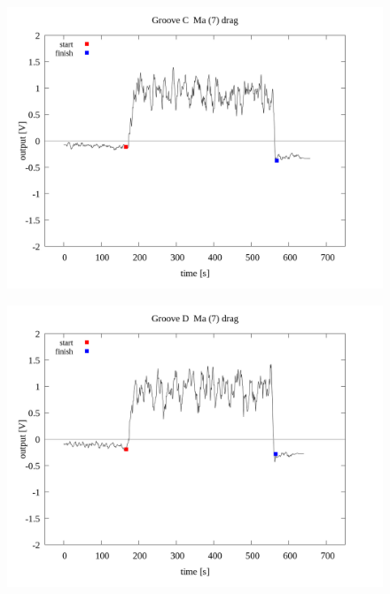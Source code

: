 \documentclass[a4paper]{jsarticle}
\begin{document}
\begin{figure}[htbp]
    \footnotesize
    \begin{center}
        \includegraphics[width=140mm]{../../../../33_result/210806/moving_average/7/drag/02/Groove_C_ma(7)_drag_02.png}
    \end{center}
\end{figure}

\begin{figure}[htbp]
    \footnotesize
    \begin{center}
        \includegraphics[width=140mm]{../../../../33_result/210806/moving_average/7/drag/02/Groove_D_ma(7)_drag_02.png}
    \end{center}
\end{figure}
\end{document}
